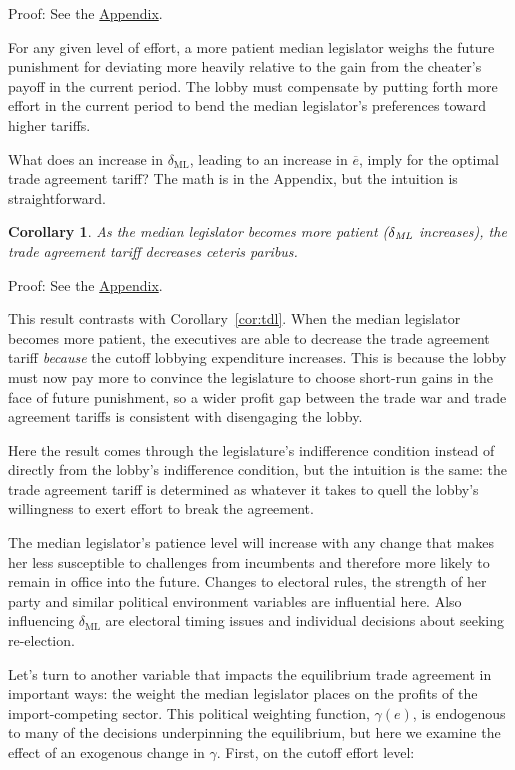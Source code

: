 \documentclass[authoryear, review]{elsarticle}
\newtheorem{corollary}{Corollary}
\newcommand{\ov}{\overline}
\newcommand{\ga}{\gamma}
\newcommand{\de}{\delta}
\begin{document}
Proof: See the \hyperlink{Cor_edm}{Appendix}.

\noindent For any given level of effort, a more patient median legislator weighs the future punishment for deviating more heavily relative to the gain from the cheater's payoff in the current period. The lobby must compensate by putting forth more effort in the current period to bend the median legislator's preferences toward higher tariffs.

What does an increase in $\de_\text{ML}$, leading to an increase in $\ov{e}$, imply for the optimal trade agreement tariff? The math is in the Appendix, but the intuition is straightforward.

\begin{corollary}
  As the median legislator becomes more patient ($\de_\emph{ML}$ increases), the trade agreement tariff decreases \emph{ceteris paribus}.
  \label{cor:tdm}
\end{corollary}

Proof: See the \hyperlink{Cor_tdm}{Appendix}.

\noindent This result contrasts with Corollary~\ref{cor:tdl}. When the median legislator becomes more patient, the executives are able to decrease the trade agreement tariff \textit{because} the cutoff lobbying expenditure increases. This is because the lobby must now pay more to convince the legislature to choose short-run gains in the face of future punishment, so a wider profit gap between the trade war and trade agreement tariffs is consistent with disengaging the lobby.

Here the result comes through the legislature's indifference condition instead of directly from the lobby's indifference condition, but the intuition is the same: the trade agreement tariff is determined as whatever it takes to quell the lobby's willingness to exert effort to break the agreement.

The median legislator's patience level will increase with any change that makes her less susceptible to challenges from incumbents and therefore more likely to remain in office into the future. Changes to electoral rules, the strength of her party and similar political environment variables are influential here. Also influencing $\de_\text{ML}$ are electoral timing issues and individual decisions about seeking re-election.

Let's turn to another variable that impacts the equilibrium trade agreement in important ways: the weight the median legislator places on the profits of the import-competing sector. This political weighting function, $\ga(e)$, is endogenous to many of the decisions underpinning the equilibrium, but here we examine the effect of an exogenous change in $\ga$. First, on the cutoff effort level:
\end{document}
